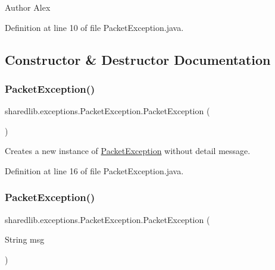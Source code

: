 \begin{DoxyAuthor}{Author}
Alex 
\end{DoxyAuthor}


Definition at line 10 of file Packet\+Exception.\+java.



\subsection{Constructor \& Destructor Documentation}
\hypertarget{classsharedlib_1_1exceptions_1_1_packet_exception_a9f598444b2ca2eab38c43994fe512095}{}\label{classsharedlib_1_1exceptions_1_1_packet_exception_a9f598444b2ca2eab38c43994fe512095} 
\subsubsection{\texorpdfstring{Packet\+Exception()}{PacketException()}\hspace{0.1cm}{\footnotesize\ttfamily [1/4]}}
{\footnotesize\ttfamily sharedlib.\+exceptions.\+Packet\+Exception.\+Packet\+Exception (\begin{DoxyParamCaption}{ }\end{DoxyParamCaption})}

Creates a new instance of {\ttfamily \hyperlink{classsharedlib_1_1exceptions_1_1_packet_exception}{Packet\+Exception}} without detail message. 

Definition at line 16 of file Packet\+Exception.\+java.

\hypertarget{classsharedlib_1_1exceptions_1_1_packet_exception_ad795dd11b6bb0ec85c35f86a0df9aadc}{}\label{classsharedlib_1_1exceptions_1_1_packet_exception_ad795dd11b6bb0ec85c35f86a0df9aadc} 
\subsubsection{\texorpdfstring{Packet\+Exception()}{PacketException()}\hspace{0.1cm}{\footnotesize\ttfamily [2/4]}}
{\footnotesize\ttfamily sharedlib.\+exceptions.\+Packet\+Exception.\+Packet\+Exception (\begin{DoxyParamCaption}\item[{String}]{msg }\end{DoxyParamCaption})}


